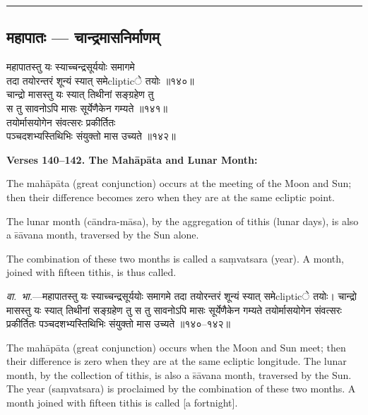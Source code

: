 \documentclass[11pt,a4paper]{article}
\newcommand{\longline}{\noindent\rule{\textwidth}{0.4pt}}
\newcommand{\dev}[1]{{\devanagarifont #1}}
\newcommand{\sectsep}{\par\vspace{0.8em}\longline\vspace{0.8em}}
\begin{document}
\sectsep

\subsection{\dev{महापातः --- चान्द्रमासनिर्माणम्}}

\begin{minipage}[t]{0.48\textwidth}
\small\devanagarifont
महापातस्तु यः स्याच्चन्द्रसूर्ययोः समागमे\\
तदा तयोरन्तरं शून्यं स्यात् समेclipticे तयोः ॥१४०॥\\[0.5em]
चान्द्रो मासस्तु यः स्यात् तिथीनां सङ्ग्रहेण तु\\
स तु सावनोऽपि मासः सूर्येणैकेन गम्यते ॥१४१॥\\[0.5em]
तयोर्मासयोगेन संवत्सरः प्रकीर्तितः\\
पञ्चदशभ्यस्तिथिभिः संयुक्तो मास उच्यते ॥१४२॥
\end{minipage}%
\hfill
\begin{minipage}[t]{0.48\textwidth}
\small
\textbf{Verses 140--142. The Mah\=ap\=ata and Lunar Month:}

The mah\=ap\=ata (great conjunction) occurs at the meeting of the Moon and Sun; then their difference becomes zero when they are at the same ecliptic point.

The lunar month (c\=andra-m\=asa), by the aggregation of tithis (lunar days), is also a \=s\=avana month, traversed by the Sun alone.

The combination of these two months is called a sa\d{mvatsara (year). A month, joined with fifteen tithis, is thus called.}
\end{minipage}

\vspace{0.5em}
\begin{minipage}[t]{0.48\textwidth}
\small\devanagarifont
\textit{वा.~भा.}---महापातस्तु यः स्याच्चन्द्रसूर्ययोः समागमे तदा तयोरन्तरं शून्यं स्यात् समेclipticे तयोः। चान्द्रो मासस्तु यः स्यात् तिथीनां सङ्ग्रहेण तु स तु सावनोऽपि मासः सूर्येणैकेन गम्यते तयोर्मासयोगेन संवत्सरः प्रकीर्तितः पञ्चदशभ्यस्तिथिभिः संयुक्तो मास उच्यते ॥१४०--१४२॥
\end{minipage}%
\hfill
\begin{minipage}[t]{0.48\textwidth}
\small
The mah\=ap\=ata (great conjunction) occurs when the Moon and Sun meet; then their difference is zero when they are at the same ecliptic longitude. The lunar month, by the collection of tithis, is also a \=s\=avana month, traversed by the Sun. The year (sa\d{mvatsara) is proclaimed by the combination of these two months. A month joined with fifteen tithis is called [a fortnight].}
\end{minipage}
\end{document}
